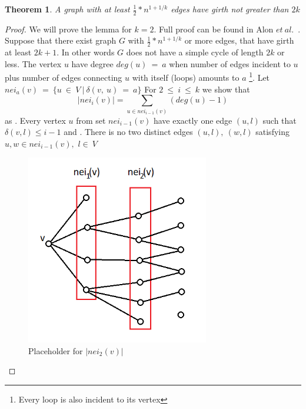 \documentclass[shortabstract, lic, english]{iithesis}
\theoremstyle{definition} \newtheorem{definition}{Definition}[chapter]
\theoremstyle{remark} \newtheorem{remark}[definition]{Observation}
\theoremstyle{plain} \newtheorem{theorem}[definition]{Theorem}
\theoremstyle{plain} \newtheorem{lemma}[definition]{Lemma}
\theoremstyle{plain} \newtheorem{conjecture}[definition]{Conjecture}
\begin{document}
\begin{theorem} \label{lotsOfEdgesLittleGirth}
    A graph with at least $\frac{1}{2} * n^{1 + 1/k}$ edges 
    have girth not greater than $2k$
\end{theorem}


\begin{proof}
    We will prove the lemma for $k=2$. Full proof can be found in Alon $et~al.$~\cite{alon}.
    \newline
    Suppose that there exist graph $G$ with $\frac{1}{2} * n^{1 + 1/k}$ or more edges, that have girth at least $2k+1$.
    In other words $G$ does not have a simple cycle of length $2k$ or less.
    \newline
    The vertex $u$ have degree $deg(u)~=~a$ when number of edges incident to $u$ plus number of edges connecting $u$ with itself (loops) amounts to $a$
    \footnote{Every loop is also incident to its vertex}.
    \newline
    Let $nei_a(v)~=~\{u~\in~V~|~\delta(v,~u)~=~a\}$
    \newline
    For $2~\leq~i~\leq~k$ we show that
    $$|nei_{i}(v)| = \sum_{u \in nei_{i-1}(v)} (deg(u)-1)$$
    as
    . Every vertex $u$ from set $nei_{i-1}(v)$ have exactly one edge $(u, l)$
    such that $\delta(v, l)\leq i-1$
    \newline
    and 
    . There is no two distinct edges $(u, l),~(w, l)$ satisfying $u,w \in nei_{i-1}(v),$ $l\in~V$ 


    \begin{figure}[h]
    \includegraphics[width=8cm]{images/placeholder_neikv}
    \centering
    \caption{Placeholder for $|nei_{2}(v)|$}
    \end{figure}


\end{proof}
\end{document}
